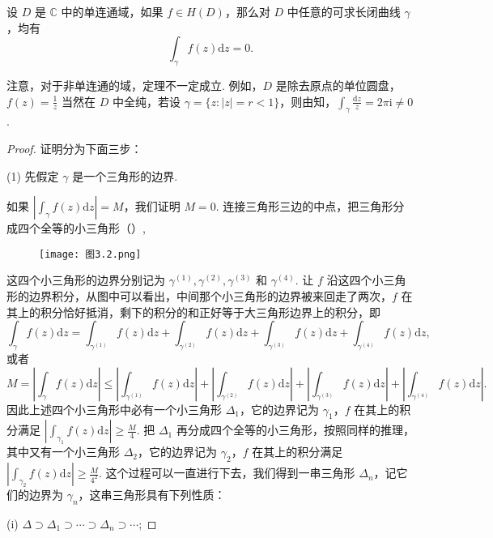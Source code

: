 \documentclass[../../main.tex]{subfiles}
\begin{document}
\begin{theorem}\label{theorem:Cauchy-Goursat定理(Cauchy积分定理)}
设 \( D \) 是 \( \mathbb{C} \) 中的单连通域，如果 \( f \in H(D) \)，那么对 \( D \) 中任意的可求长闭曲线 \( \gamma \)，均有
\[
\int_\gamma f(z)\mathrm{d}z = 0.
\]
\end{theorem}
\begin{remark}
注意，对于非单连通的域，定理不一定成立. 例如，\( D \) 是除去原点的单位圆盘，\( f(z) = \frac{1}{z} \) 当然在 \( D \) 中全纯，若设 \( \gamma = \{ z: |z| = r < 1 \} \)，则由知，\( \int_\gamma \frac{\mathrm{d}z}{z} = 2\pi \mathrm{i} \neq 0 \).
\end{remark}
\begin{proof}
证明分为下面三步：

(1) 先假定 \( \gamma \) 是一个三角形的边界.

如果 \( \left| \int_\gamma f(z)\mathrm{d}z \right| = M \)，我们证明 \( M = 0 \). 连接三角形三边的中点，把三角形分成四个全等的小三角形（）,
\begin{figure}[H]
\centering
\texttt{[image: 图3.2.png]}
\caption{}
\label{figure:图3.2}
\end{figure}
这四个小三角形的边界分别记为 \( \gamma^{(1)}, \gamma^{(2)}, \gamma^{(3)} \) 和 \( \gamma^{(4)} \). 让 \( f \) 沿这四个小三角形的边界积分，从图中可以看出，中间那个小三角形的边界被来回走了两次，\( f \) 在其上的积分恰好抵消，剩下的积分的和正好等于大三角形边界上的积分，即
\[
\int_\gamma f(z)\mathrm{d}z = \int_{\gamma^{(1)}} f(z)\mathrm{d}z + \int_{\gamma^{(2)}} f(z)\mathrm{d}z
+ \int_{\gamma^{(3)}} f(z)\mathrm{d}z + \int_{\gamma^{(4)}} f(z)\mathrm{d}z,
\]
或者
\[
M = \left| \int_\gamma f(z)\mathrm{d}z \right|
\leqslant \left| \int_{\gamma^{(1)}} f(z)\mathrm{d}z \right| + \left| \int_{\gamma^{(2)}} f(z)\mathrm{d}z \right|
+ \left| \int_{\gamma^{(3)}} f(z)\mathrm{d}z \right| + \left| \int_{\gamma^{(4)}} f(z)\mathrm{d}z \right|.
\]
因此上述四个小三角形中必有一个小三角形 \( \Delta_1 \)，它的边界记为 \( \gamma_1 \)，\( f \) 在其上的积分满足 \( \left| \int_{\gamma_1} f(z)\mathrm{d}z \right| \geqslant \frac{M}{4} \). 把 \( \Delta_1 \) 再分成四个全等的小三角形，按照同样的推理，其中又有一个小三角形 \( \Delta_2 \)，它的边界记为 \( \gamma_2 \)，\( f \) 在其上的积分满足 \( \left| \int_{\gamma_2} f(z)\mathrm{d}z \right| \geqslant \frac{M}{4^2} \). 这个过程可以一直进行下去，我们得到一串三角形 \( \Delta_n \)，记它们的边界为 \( \gamma_n \)，这串三角形具有下列性质：

(i) \( \Delta \supset \Delta_1 \supset \cdots \supset \Delta_n \supset \cdots \);


\end{proof}
\end{document}
